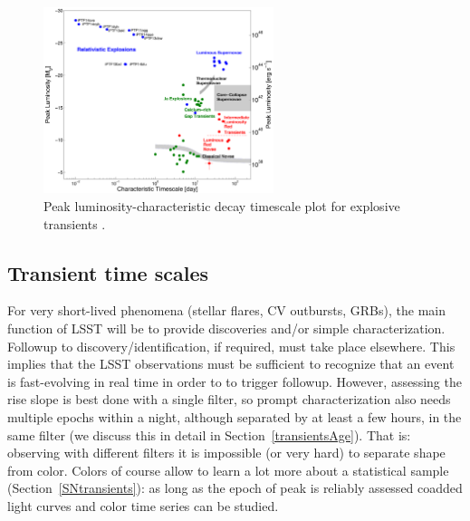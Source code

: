 \begin{figure}[hbt]
\centerline{
\includegraphics[width=0.6\textwidth]{figs/transients/taumv_2014.pdf}
}
\caption{
Peak luminosity-characteristic decay timescale plot for explosive
transients \citep[adapted from][]{2011PhDT........35K}.
}
\label{fig:transient_phase_space}
\end{figure}





%




\subsection{Transient time scales}

For very short-lived phenomena (stellar flares, CV outbursts, GRBs),
the main function of LSST will be to provide discoveries and/or simple
characterization.  Followup to discovery/identification, if required,
must take place elsewhere. This implies that the LSST observations
must be sufficient to recognize that an event is fast-evolving in real
time in order to to trigger followup. However, assessing the rise
slope is best done with a single filter, so prompt characterization
also needs multiple epochs within a night, although separated by at
least a few hours, in the same filter (we discuss this in detail in
Section~\ref{transientsAge}). That is: observing with different
filters it is impossible (or very hard) to separate shape from
color. Colors of course allow to learn a lot more about a statistical
sample (Section~\ref{SNtransients}): as long as the epoch of peak is
reliably assessed coadded light curves and color time series can be studied.

